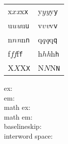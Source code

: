 \documentclass[20pt]{rntz}
\begin{document}
\Huge
\begin{tabular}{ll}
  x$x$\emph{x}\textsf{x}\texttt{x} & y$y$\emph{y}\textsf{y}\texttt{y}
  \\
  u$u$\emph{u}\textsf{u}\texttt{u} & v$v$\emph{v}\textsf{v}\texttt{v}
  \\
  n$n$\emph{n}\textsf{n}\texttt{n} & q$q$\emph{q}\textsf{q}\texttt{q}
  \\
  f$f$\emph{f}\textsf{f}\texttt{f} & h$h$\emph{h}\textsf{h}\texttt{h}
  \\
  X$X$\textsf{X}\texttt{X} & N$N$\textsf{N}\texttt{N}
\end{tabular}

\clearpage\linespread{1}\normalsize
ex: \the{}\font\(\)\\
em: \the{}\font\\
math ex: \the{}\\
math em: \the{}\\
baselineskip: \the\baselineskip\\
interword space: \the{}\font\\
\end{document}
